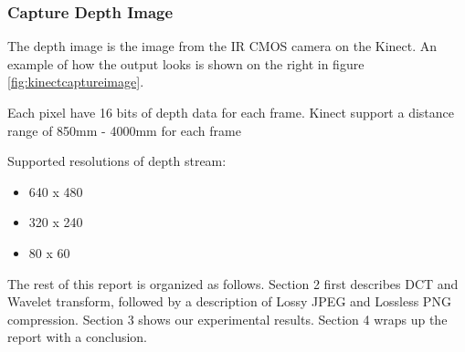 \subsubsection{Capture Depth Image}
The depth image is the image from the IR CMOS camera on the Kinect. An example of how the output looks is shown on the right in figure \ref{fig:kinectcaptureimage}.

Each pixel have 16 bits of depth data for each frame. Kinect support a distance range of 850mm - 4000mm for each frame

Supported resolutions of depth stream:
\begin{itemize}
\item 640 x 480
\item 320 x 240
\item 80 x 60
\end{itemize}


The rest of this report is organized as follows. Section 2 first describes DCT and Wavelet transform, followed by a description of Lossy JPEG and Lossless PNG compression. Section 3 shows our experimental results. Section 4 wraps up the report with a conclusion.
